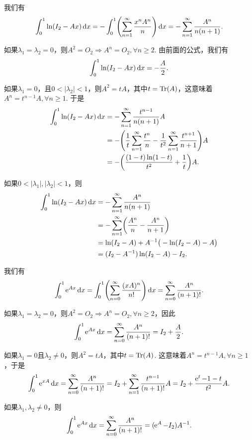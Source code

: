 \begin{solution}
  我们有
  \[
    \int_0^1\ln(I_2-Ax)\dif x = - \int_0^1 \left( \sum_{n=1}^\infty \frac{x^nA^n}{n} \right) \dif x = - \sum_{n=1}^\infty \frac{A^n}{n(n+1)}.
  \]

  如果$\lambda_1=\lambda_2=0$，则$A^2=O_2\Rightarrow
        A^n=O_2,\forall n\ge2$. 由前面的公式，我们有
        \[
          \int_0^1 \ln(I_2 - Ax) \mathop{}\!\mathrm d x = - \frac A2.
        \]

  如果$\lambda_1=0$，且$0<|\lambda_2|<1$，则$A^2=tA$，其中$t=\operatorname{Tr}(A)$，这意味着$A^n=t^{n-1}A,\forall n\ge1$. 于是
  \begin{align*}
    \int_0^1 \ln(I_2 - Ax) \dif x & = - \sum_{n=1}^\infty \frac{t^{n-1}}{n(n+1)} A \\
    & = - \left( \frac1t\sum_{n=1}^\infty \frac {t^n}n - \frac1{t^2}\sum_{n=1}^\infty \frac{t^{n+1}}{n+1} \right) A \\
    & = - \left( \frac{(1-t)\ln(1-t)}{t^2} + \frac1t \right)A.
  \end{align*}

  如果$0<|\lambda_1|,|\lambda_2|<1$，则
  \begin{align*}
    \int_0^1 \ln(I_2 - Ax) \dif x & = - \sum_{n=1}^\infty \frac{A^n}{n(n+1)} \\
    & = - \sum_{n=1}^\infty\left( \frac{A^n}n - \frac{A^n}{n+1} \right) \\
    & = \ln(I_2 - A) + A^{-1} \big( -\ln(I_2 - A) - A \big) \\
    & = (I_2 - A^{-1})\ln(I_2 - A) - I_2.
  \end{align*}
\end{solution}

\begin{solution}
  我们有
  \[
    \int_0^1 \ee^{Ax} \dif x = \int_0^1\left( \sum_{n=0}^\infty \frac{(xA)^n}{n!} \right) \dif x = \sum_{n=0}^\infty \frac{A^n}{(n+1)!}.
  \]

  如果$\lambda_1=\lambda_2=0$，则$A^2=O_2\Rightarrow
        A^n=O_2,\forall n\ge2$，因此
  \[
    \int_0^1 \operatorname{\!\!\;\mathrm e}^{Ax} \mathop{}\!\mathrm d x = \sum_{n=0}^\infty \frac{A^n}{(n+1)!} = I_2 + \frac A2.
  \]

  如果$\lambda_1=0$且$\lambda_2\ne0$，则$A^2=tA$，其中$t=\operatorname{Tr}(A)$. 这意味着$A^n=t^{n-1}A,\forall n\ge1$，于是
  \[
    \int_0^1 \operatorname{\!\!\;\mathrm e}^{xA} \mathop{}\!\mathrm d x = \sum_{n=0}^\infty \frac{A^n}{(n+1)!} = I_2 + \sum_{n=1}^\infty \frac{t^{n-1}}{(n+1)!} A = I_2 + \frac{\operatorname{\!\!\;\mathrm e}^t-1-t}{t^2}A.
  \]

  如果$\lambda_1,\lambda_2\ne0$，则
  \[
    \int_0^1\operatorname{\!\!\;\mathrm e}^{Ax} \mathop{}\!\mathrm d x = \sum_{n=0}^\infty \frac{A^n}{(n+1)!} = (\operatorname{\!\!\;\mathrm e}^A - I_2) A^{-1}.
  \]
\end{solution}

